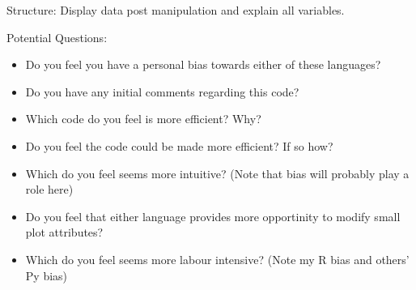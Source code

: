 

Structure: Display data post manipulation and explain all variables.

Potential Questions:
\begin{itemize}
    \item Do you feel you have a personal bias towards either of these languages?
    \item Do you have any initial comments regarding this code?
    \item Which code do you feel is more efficient? Why? %
    \item Do you feel the code could be made more efficient? If so how?
    \item Which do you feel seems more intuitive? (Note that bias will probably play a role here)
    \item Do you feel that either language provides more opportinity to modify small plot attributes? %
    \item Which do you feel seems more labour intensive? (Note my R bias and others' Py bias)
\end{itemize}